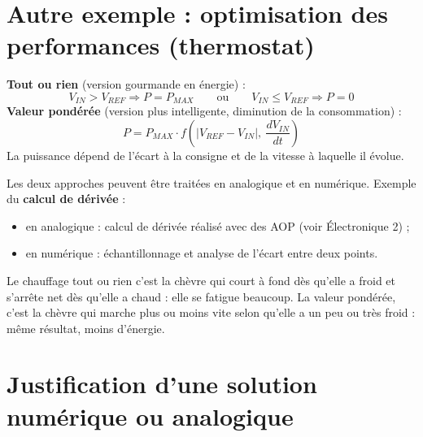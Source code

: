 \section{Autre exemple : optimisation des performances (thermostat)}


\begin{exbox}[title=Régulation de température avec thermostat]
\textbf{Tout ou rien} (version gourmande en énergie) :
\[ V_{IN} > V_{REF} \Rightarrow P = P_{MAX} \qquad\text{ou}\qquad V_{IN} \le V_{REF} \Rightarrow P = 0 \]
\textbf{Valeur pondérée} (version plus intelligente, diminution de la consommation) :
\[ P = P_{MAX}\cdot f\!\left(|V_{REF}-V_{IN}|,\ \frac{dV_{IN}}{dt}\right) \]
La puissance dépend de l'écart à la consigne et de la vitesse à laquelle il évolue.
\end{exbox}

Les deux approches peuvent être traitées en analogique et en numérique. Exemple du
\textbf{calcul de dérivée} :
\begin{itemize}
  \item en analogique : calcul de dérivée réalisé avec des AOP (voir Électronique 2) ;
  \item en numérique : échantillonnage et analyse de l'écart entre deux points.
\end{itemize}

\begin{goatbox}
Le chauffage \og tout ou rien\fg{} c'est la chèvre qui court à fond dès qu'elle a froid et
s'arrête net dès qu'elle a chaud : elle se fatigue beaucoup. La \og valeur pondérée\fg{},
c'est la chèvre qui marche plus ou moins vite selon qu'elle a un peu ou très froid : même
résultat, moins d'énergie.
\end{goatbox}

\section{Justification d'une solution numérique ou analogique}


